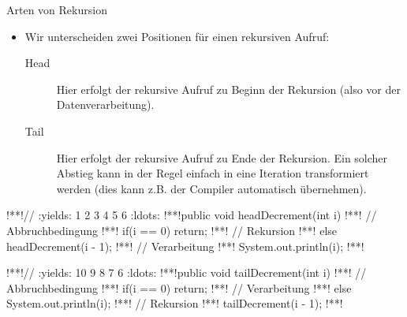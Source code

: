 \begin{frame}[fragile]{Arten von Rekursion}
    \begin{itemize}[<+(1)->]
        \widei
        \item Wir unterscheiden zwei Positionen für einen rekursiven Aufruf: \begin{description}
            \item[Head] Hier erfolgt der rekursive Aufruf zu Beginn der Rekursion (also vor der Datenverarbeitung).
            \item[Tail] Hier erfolgt der rekursive Aufruf zu Ende der Rekursion.\pause{} Ein solcher Abstieg kann in der Regel einfach in eine Iteration transformiert werden (dies kann z.B. der Compiler automatisch übernehmen).
        \end{description}
    \end{itemize}
\begin{center}\scriptsize%
\begin{minipage}{0.45\linewidth}
\begin{plainjava}
!**!// :yields: 1 2 3 4 5 6 :ldots:
!**!public void headDecrement(int i){
!**!    // Abbruchbedingung
!**!    if(i == 0) return;
!**!    // Rekursion
!**!    else headDecrement(i - 1);
!**!    // Verarbeitung
!**!    System.out.println(i);
!**!}
\end{plainjava}
\end{minipage}\qquad\begin{minipage}{0.45\linewidth}
\begin{plainjava}
!**!// :yields: 10 9 8 7 6 :ldots:
!**!public void tailDecrement(int i){
!**!    // Abbruchbedingung
!**!    if(i == 0) return;
!**!    // Verarbeitung
!**!    else System.out.println(i);
!**!    // Rekursion
!**!    tailDecrement(i - 1);
!**!}
\end{plainjava}
\end{minipage}
\end{center}
\end{frame}

